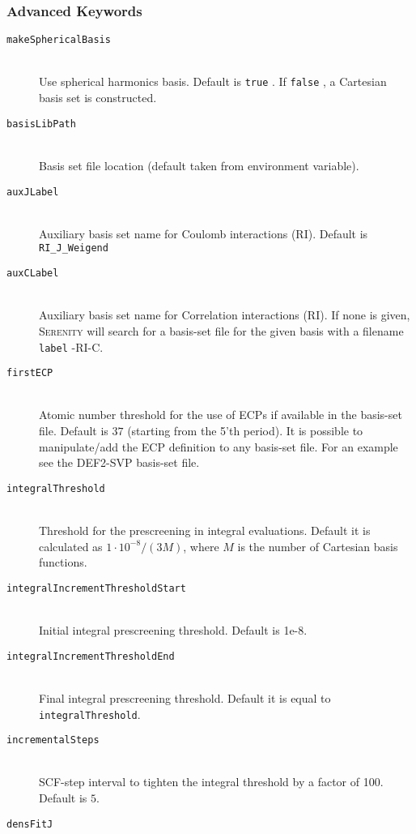 \documentclass[bibliography=totocnumbered,a4paper,10pt,oneside]{scrbook}
\newcommand{
\serenity}{\textsc{Serenity}\xspace}
\newcommand{\ttt}[1]{%
  \begingroup\setlength{\fboxsep}{1pt}%
  \colorbox{serenity-green!30}{\texttt{\hspace*{2pt}\vphantom{(g}#1\hspace*{2pt}}}%
  \endgroup
}
\begin{document}
\subsubsection{Advanced Keywords}
\begin{description}
    \item [\texttt{makeSphericalBasis}]\hfill \\
    Use spherical harmonics basis. Default is \ttt{true}. If \ttt{false}, a Cartesian basis set is constructed.
    \item [\texttt{basisLibPath}]\hfill \\
    Basis set file location (default taken from environment variable).
    \item [\texttt{auxJLabel}]\hfill \\
    Auxiliary basis set name for Coulomb interactions (RI). Default is \ttt{RI\_J\_Weigend}
    \item [\texttt{auxCLabel}]\hfill \\
    Auxiliary basis set name for Correlation interactions (RI). If none is given, \serenity will search for a
    basis-set file for the given basis with a filename \ttt{label}-RI-C.
    \item [\texttt{firstECP}]\hfill \\
    Atomic number threshold for the use of ECPs if available in the basis-set file. Default is $37$ (starting from the 5'th period).
    It is possible to manipulate/add the ECP definition to any basis-set file. For an example see the DEF2-SVP basis-set file.
    \item [\texttt{integralThreshold}]\hfill \\
    Threshold for the prescreening in integral evaluations. Default it is calculated as $1\cdot 10^{-8}/(3 M)$, where $M$ is
    the number of Cartesian basis functions.
    \item [\texttt{integralIncrementThresholdStart}]\hfill \\
    Initial integral prescreening threshold. Default is 1e-8.
    \item [\texttt{integralIncrementThresholdEnd}]\hfill \\
    Final integral prescreening threshold. Default it is equal to \texttt{integralThreshold}.
    \item [\texttt{incrementalSteps}]\hfill \\
    SCF-step interval to tighten the integral threshold by a factor of 100. Default is $5$.
    \item [\texttt{densFitJ}]\hfill \\

\end{description}
\end{document}
